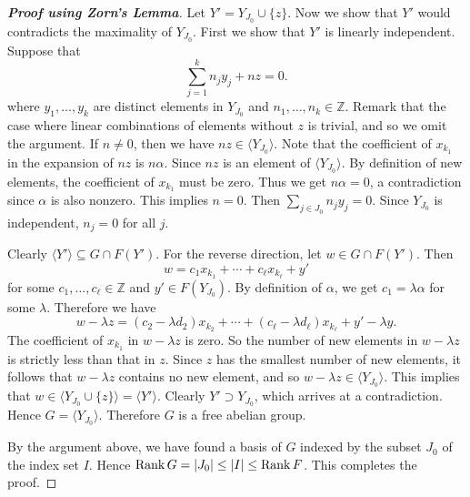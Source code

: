 \begin{proof}[\textbf{Proof using Zorn's Lemma}]
	Let $Y' = Y_{J_0} \cup \{z\}$. Now we show that $Y'$ would contradicts the maximality of $Y_{J_0}$.  First we show that $Y'$ is linearly independent. Suppose that
	\begin{equation*}
		\sum_{j=1}^k n_j y_j + nz = 0.
	\end{equation*}
	where $y_1,\dots, y_k$ are distinct elements in $Y_{J_0}$ and $n_1,\dots, n_k\in \mathbb{Z}$. Remark that the case where linear combinations of elements without $z$ is trivial, and so we omit the argument. If $n\neq 0$, then we have $nz  \in \langle Y_{J_0} \rangle$. Note that the coefficient of $x_{k_1}$ in the expansion of $nz$ is $n\alpha$. Since $nz$ is an element of $\langle Y_{J_0} \rangle$. By definition of new elements, the coefficient of $x_{k_1}$ must be zero. Thus we get $n\alpha = 0$, a contradiction since $\alpha$ is also nonzero. This implies $n = 0$. Then $\sum_{j\in J_0} n_j y_j = 0$. Since $Y_{J_0}$ is independent, $n_j=0$ for all $j$.
	
	Clearly $\langle Y' \rangle \subseteq G \cap F(Y')$. For the reverse direction, let  $w\in G\cap F(Y')$. Then $$w = c_1 x_{k_1} + \cdots +c_\ell x_{k_{\ell}} + y'$$
	for some $c_1,\dots, c_\ell\in\mathbb{Z}$ and $y'\in F(Y_{J_0})$. By definition of $\alpha$, we get $c_1 = \lambda \alpha$ for some $\lambda$. Therefore we have
	\begin{equation*}
		w-\lambda z = (c_2-\lambda d_2) x_{k_2} + \cdots + (c_\ell- \lambda d_\ell) x_{k_{\ell}} + y' -\lambda y.
	\end{equation*}
	The coefficient of $x_{k_1}$ in $w - \lambda z$ is zero. So the number of new elements in $w-\lambda z$ is strictly less than that in $z$. Since $z$ has the smallest number of new elements, it follows that $w-\lambda z$ contains no new element, and so $w-\lambda z\in \langle Y_{J_0} \rangle$. This implies that $w  \in \langle Y_{J_0}\cup \{z\} \rangle = \langle Y' \rangle$. Clearly $Y' \supset Y_{J_0}$, which arrives at a contradiction. Hence $G =  \langle Y_{J_0}\rangle$. Therefore $G$ is a free abelian group.
	
	By the argument above, we have found a basis of $G$ indexed by the subset $J_0$ of the index set $I$. Hence $\operatorname{Rank}  G = |J_0|\leq |I| \leq \operatorname{Rank}  F$. This completes the proof.
\end{proof}
